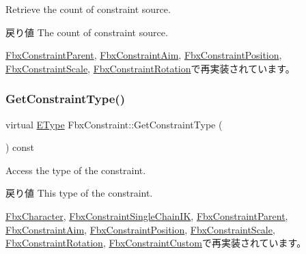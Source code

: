 Retrieve the count of constraint source. \begin{DoxyReturn}{戻り値}
The count of constraint source. 
\end{DoxyReturn}


\hyperlink{class_fbx_constraint_parent_aa7747054ebeee0f94ce907451f648497}{Fbx\+Constraint\+Parent}, \hyperlink{class_fbx_constraint_aim_aa58f34b660f30caff3f89c5372a25a5c}{Fbx\+Constraint\+Aim}, \hyperlink{class_fbx_constraint_position_a5f6c49200df6a7a1fe704084c2b56e09}{Fbx\+Constraint\+Position}, \hyperlink{class_fbx_constraint_scale_a5c4500706618751078dddca3652ce936}{Fbx\+Constraint\+Scale}, \hyperlink{class_fbx_constraint_rotation_ab27178d5b53654eb9f41f6e3f3a4c5dc}{Fbx\+Constraint\+Rotation}で再実装されています。

\mbox{\label{class_fbx_constraint_adbeea66a1a605531a019aa6df90dc45b}} 
\subsubsection{\texorpdfstring{Get\+Constraint\+Type()}{GetConstraintType()}}
{\footnotesize\ttfamily virtual \hyperlink{class_fbx_constraint_a49c1634663395eab7c28856df233ec66}{E\+Type} Fbx\+Constraint\+::\+Get\+Constraint\+Type (\begin{DoxyParamCaption}{ }\end{DoxyParamCaption}) const\hspace{0.3cm}{\ttfamily [virtual]}}

Access the type of the constraint. \begin{DoxyReturn}{戻り値}
This type of the constraint. 
\end{DoxyReturn}


\hyperlink{class_fbx_character_ab6c9f1540880fa72c17a27d19ff11425}{Fbx\+Character}, \hyperlink{class_fbx_constraint_single_chain_i_k_adc9d38f5ae55bf9c6415334a81cbdffb}{Fbx\+Constraint\+Single\+Chain\+IK}, \hyperlink{class_fbx_constraint_parent_a02f6bd2dda6447a23d81d82ce06b73f0}{Fbx\+Constraint\+Parent}, \hyperlink{class_fbx_constraint_aim_a061ee3079d1182fa2e1a5eeebff01b15}{Fbx\+Constraint\+Aim}, \hyperlink{class_fbx_constraint_position_a79f710b1fec4b1285b53dec13ea68824}{Fbx\+Constraint\+Position}, \hyperlink{class_fbx_constraint_scale_a7eb92c352d4a4bd3c0754dd4e53fa6e4}{Fbx\+Constraint\+Scale}, \hyperlink{class_fbx_constraint_rotation_a8d9f54ac347d18a0871eafc21e88cb77}{Fbx\+Constraint\+Rotation}, \hyperlink{class_fbx_constraint_custom_a80bc6e130ef40b27e4621e1a54b22eb8}{Fbx\+Constraint\+Custom}で再実装されています。

